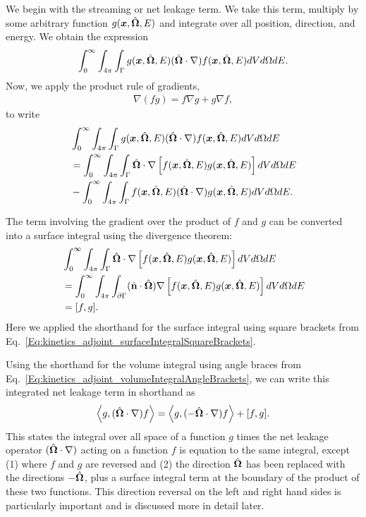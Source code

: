 We begin with the streaming or net leakage term. We take this term, multiply by some arbitrary function $g(\bm{x},\hat{\mathbf{\Omega}},E)$ and integrate over all position, direction, and energy. We obtain the expression
\begin{align}
  \int_0^\infty \int_{4\pi} \int_\Gamma g(\bm{x},\hat{\mathbf{\Omega}},E) ( \hat{\mathbf{\Omega}} \cdot \nabla ) f(\bm{x},\hat{\mathbf{\Omega}},E) dV d\Omega dE . \nonumber
\end{align}
Now, we apply the product rule of gradients,
\begin{align}
  \nabla(fg) = f \nabla g + g \nabla f,
\end{align}
to write
\begin{align}
   &\int_0^\infty \int_{4\pi} \int_\Gamma g(\bm{x},\hat{\mathbf{\Omega}},E)  (\hat{\mathbf{\Omega}} \cdot \nabla) f(\bm{x},\hat{\mathbf{\Omega}},E) dV d\Omega dE \nonumber \\
   &= \int_0^\infty \int_{4\pi} \int_\Gamma \hat{\mathbf{\Omega}} \cdot \nabla \left[ f(\bm{x},\hat{\mathbf{\Omega}},E) g(\bm{x},\hat{\mathbf{\Omega}},E) \right] dV d\Omega dE \nonumber \\
   &- \int_0^\infty \int_{4\pi} \int_\Gamma f(\bm{x},\hat{\mathbf{\Omega}},E)  (\hat{\mathbf{\Omega}} \cdot \nabla) g(\bm{x},\hat{\mathbf{\Omega}},E) dV d\Omega dE .
\end{align}

The term involving the gradient over the product of $f$ and $g$ can be converted into a surface integral using the divergence theorem:
\begin{align}
   &\int_0^\infty \int_{4\pi} \int_\Gamma \hat{\mathbf{\Omega}} \cdot \nabla \left[ f(\bm{x},\hat{\mathbf{\Omega}},E) g(\bm{x},\hat{\mathbf{\Omega}},E) \right] dV d\Omega dE \nonumber \\
   &= \int_0^\infty \int_{4\pi} \int_{\partial \Gamma} ( \hat{\mathbf{n}} \cdot \hat{\mathbf{\Omega}} ) \nabla \left[ f(\bm{x},\hat{\mathbf{\Omega}},E) g(\bm{x},\hat{\mathbf{\Omega}},E) \right] dV d\Omega dE \nonumber \\
   &= [ f, g ].
\end{align}
Here we applied the shorthand for the surface integral using square brackets from Eq.~\eqref{Eq:kinetics_adjoint_surfaceIntegralSquareBrackets}.

Using the shorthand for the volume integral using angle braces from Eq.~\eqref{Eq:kinetics_adjoint_volumeIntegralAngleBrackets}, we can write this integrated net leakage term in shorthand as
\begin{align}
  \left< g, ( \hat{\mathbf{\Omega}} \cdot \nabla ) f \right> = \left< g, ( -\hat{\mathbf{\Omega}} \cdot \nabla ) f \right> + [ f , g ] . \label{Eq:kinetics_forwardAdjointTransportGeneralIdentity}
\end{align}
This states the integral over all space of a function $g$ times the net leakage operator $(\hat{\mathbf{\Omega}} \cdot \nabla)$ acting on a function $f$ is equation to the same integral, except (1) where $f$ and $g$ are reversed and (2) the direction $\hat{\mathbf{\Omega}}$ has been replaced with the directions $-\hat{\mathbf{\Omega}}$, plus a surface integral term at the boundary of the product of these two functions. This direction reversal on the left and right hand sides is particularly important and is discussed more in detail later.

